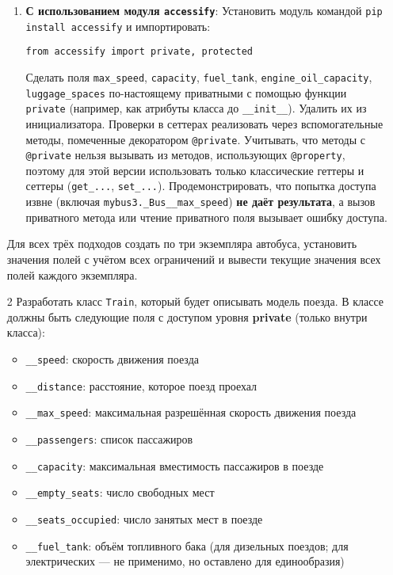 \begin{enumerate}
\begin{enumerate}
    \item \textbf{С использованием модуля \texttt{accessify}}:  
    Установить модуль командой \texttt{pip install accessify} и импортировать:  
    \begin{verbatim}
from accessify import private, protected
    \end{verbatim}  
    Сделать поля \texttt{max\_speed}, \texttt{capacity}, \texttt{fuel\_tank}, \texttt{engine\_oil\_capacity}, \texttt{luggage\_spaces} по-настоящему приватными с помощью функции \texttt{private} (например, как атрибуты класса до \texttt{\_\_init\_\_}). Удалить их из инициализатора.  
    Проверки в сеттерах реализовать через вспомогательные методы, помеченные декоратором \texttt{@private}.  
    Учитывать, что методы с \texttt{@private} нельзя вызывать из методов, использующих \texttt{@property}, поэтому для этой версии использовать только классические геттеры и сеттеры (\texttt{get\_...}, \texttt{set\_...}).  
    Продемонстрировать, что попытка доступа извне (включая \texttt{mybus3.\_Bus\_\_max\_speed}) \textbf{не даёт результата}, а вызов приватного метода или чтение приватного поля вызывает ошибку доступа.
\end{enumerate}
Для всех трёх подходов создать по три экземпляра автобуса, установить значения полей с учётом всех ограничений и вывести текущие значения всех полей каждого экземпляра.
\item[2] Разработать класс \texttt{Train}, который будет описывать модель поезда. В классе должны быть следующие поля с доступом уровня \textbf{private} (только внутри класса):
\begin{itemize}
    \item \texttt{\_\_speed}: скорость движения поезда  
    \item \texttt{\_\_distance}: расстояние, которое поезд проехал  
    \item \texttt{\_\_max\_speed}: максимальная разрешённая скорость движения поезда  
    \item \texttt{\_\_passengers}: список пассажиров  
    \item \texttt{\_\_capacity}: максимальная вместимость пассажиров в поезде  
    \item \texttt{\_\_empty\_seats}: число свободных мест  
    \item \texttt{\_\_seats\_occupied}: число занятых мест в поезде  
    \item \texttt{\_\_fuel\_tank}: объём топливного бака (для дизельных поездов; для электрических — не применимо, но оставлено для единообразия)  

\end{itemize}
\end{enumerate}
